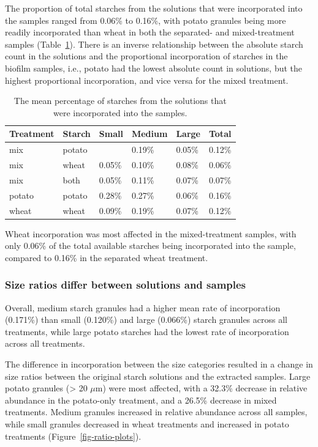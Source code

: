 \documentclass[
  b5paper,
]{book}
\begin{document}
The proportion of total starches from the solutions that were
incorporated into the samples ranged from 0.06\% to 0.16\%, with potato
granules being more readily incorporated than wheat in both the
separated- and mixed-treatment samples (Table~\ref{tbl-sample-prop}).
There is an inverse relationship between the absolute starch count in
the solutions and the proportional incorporation of starches in the
biofilm samples, i.e., potato had the lowest absolute count in
solutions, but the highest proportional incorporation, and vice versa
for the mixed treatment.

\begin{longtable}[]{@{}llllll@{}}

\caption{\label{tbl-sample-prop}The mean percentage of starches from the
solutions that were incorporated into the samples.}

\tabularnewline

\toprule\noalign{}
Treatment & Starch & Small & Medium & Large & Total \\
\midrule\noalign{}
\endhead
\bottomrule\noalign{}
\endlastfoot
mix & potato & & 0.19\% & 0.05\% & 0.12\% \\
mix & wheat & 0.05\% & 0.10\% & 0.08\% & 0.06\% \\
mix & both & 0.05\% & 0.11\% & 0.07\% & 0.07\% \\
potato & potato & 0.28\% & 0.27\% & 0.06\% & 0.16\% \\
wheat & wheat & 0.09\% & 0.19\% & 0.07\% & 0.12\% \\

\end{longtable}

Wheat incorporation was most affected in the mixed-treatment samples,
with only 0.06\% of the total available starches being incorporated into
the sample, compared to 0.16\% in the separated wheat treatment.

\subsubsection{Size ratios differ between solutions and
samples}\label{size-ratios-differ-between-solutions-and-samples}

Overall, medium starch granules had a higher mean rate of incorporation
(0.171\%) than small (0.120\%) and large (0.066\%) starch granules
across all treatments, while large potato starches had the lowest rate
of incorporation across all treatments.

The difference in incorporation between the size categories resulted in
a change in size ratios between the original starch solutions and the
extracted samples. Large potato granules (\textgreater{} 20 \(\mu\)m)
were most affected, with a 32.3\% decrease in relative abundance in the
potato-only treatment, and a 26.5\% decrease in mixed treatments. Medium
granules increased in relative abundance across all samples, while small
granules decreased in wheat treatments and increased in potato
treatments (Figure~\ref{fig-ratio-plots}).
\end{document}
